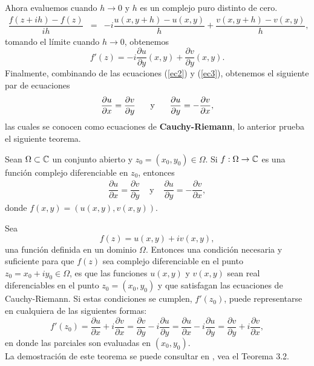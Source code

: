 Ahora evaluemos cuando $h\rightarrow 0$ y $h$ es un complejo puro distinto de cero. 
\[
\begin{array}{ccl}
	\dfrac{f(z+ih)-f(z)}{ih}&=&-i\dfrac{u(x,y+h)-u(x,y)}{h}+\dfrac{v(x,y+h)-v(x,y)}{h},
\end{array}
\]
tomando el límite cuando $h\rightarrow 0$, obtenemos  
\begin{equation}\label{ec3}
	f'(z)=-i\dfrac{\partial u}{\partial{y}}(x,y)+\dfrac{\partial v}{\partial y}(x,y).
\end{equation}
Finalmente, combinando de las ecuaciones (\ref{ec2}) y (\ref{ec3}), obtenemos el siguiente par de ecuaciones 
\begin{equation}
	\dfrac{\partial u}{\partial x} = \dfrac{\partial v}{\partial y}\hspace{0.5 cm} \mbox{ y } \hspace{0.5 cm} \dfrac{\partial u}{\partial y} =- \dfrac{\partial v}{\partial x},
\end{equation}
las cuales se conocen como ecuaciones de \textbf{Cauchy-Riemann}, lo anterior prueba el siguiente teorema.

\begin{teor}\label{teo3}
		Sean $\Omega\subset \mathbb{C}$ un conjunto abierto y $z_{0}=(x_{0},y_{0}) \in \Omega$. Si $f:\Omega\rightarrow\mathbb{C}$ es una función complejo diferenciable  en $z_{0}$, entonces
		\[
			\begin{array}{ccl}
				\dfrac{\partial u}{\partial x} = \dfrac{\partial v}{\partial y} &\mbox{ y } & \dfrac{\partial u}{\partial y} =-\dfrac{\partial v}{\partial x},
			\end{array}
		\]
		donde $f(x,y)=(u(x,y),v(x,y))$.
\end{teor}


\begin{teor}\label{TECR}
	Sea $$f(z)=u(x,y)+iv(x,y),$$ una función definida en un dominio $\Omega$. Entonces una
	condición necesaria y suficiente para que $f (z)$ sea complejo diferenciable en el punto
	$z_0 = x_0 + iy_0 \in \Omega$, es que las funciones $u(x, y)$ y $v(x, y)$ sean real diferenciables en el
	punto $z_0=(x_0, y_0)$ y que satisfagan las ecuaciones de Cauchy-Riemann. Si estas condiciones se cumplen, $f'(z_0)$, puede representarse en cualquiera de las siguientes formas:
	\begin{equation}
		f'(z_0)=\dfrac{\partial u}{\partial x}+i\dfrac{\partial v}{\partial x}=\dfrac{\partial v}{\partial y}-i\dfrac{\partial u}{\partial y}=\dfrac{\partial u}{\partial x}-i\dfrac{\partial u}{\partial y}=\dfrac{\partial v}{\partial y}+i\dfrac{\partial v}{\partial x},
	\end{equation}
	 en donde las parciales son evaluadas en $(x_0, y_0)$.\\
	La demostración de este teorema se puede consultar en \cite{silverman}, vea el Teorema 3.2.
\end{teor}

